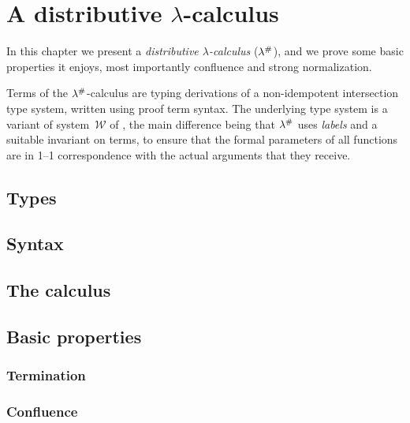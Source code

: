 \chapter{A distributive $\lambda$-calculus}

In this chapter we present a
{\em distributive $\lambda$-calculus} ($\lambda^{\mathtt{\#}}$),
and we prove some basic properties it enjoys,
most importantly confluence and strong normalization.

Terms of the $\lambda^{\mathtt{\#}}$-calculus are typing derivations of a non-idempotent intersection type
system, written using proof term syntax.
The underlying type system is a variant of
system~$\mathcal{W}$ of \cite{bucciarelli2014inhabitation,bucciarelli2017non},
the main difference being that $\lambda^{\mathtt{\#}}$
uses {\em labels} and a suitable invariant on terms,
to ensure that the formal parameters of all functions
are in 1--1 correspondence with the actual arguments that they receive.

\section{Types}


\section{Syntax}


\section{The calculus}


\section{Basic properties}


\subsection*{Termination}


\subsection*{Confluence}


